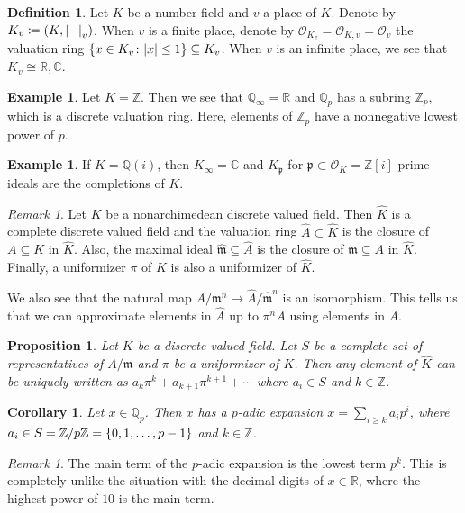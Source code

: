 \documentclass[leqno, openany]{memoir}
\newtheorem{cor}[thm]{Corollary}
\newtheorem{prop}[thm]{Proposition}
\theoremstyle{definition}
\newtheorem{defn}[thm]{Definition}
\newtheorem{exm}[thm]{Example}
\theoremstyle{remark}
\newtheorem{rmk}[thm]{Remark}
\theoremstyle{plain}
\theoremstyle{definition}
\theoremstyle{remark}
\newcommand{\R}{\mathbb{R}}
\newcommand{\C}{\mathbb{C}}
\newcommand{\Z}{\mathbb{Z}}
\newcommand{\Q}{\mathbb{Q}}
\newcommand{\mc}[1]{\mathcal{#1}}
\newcommand{\mf}[1]{\mathfrak{#1}}
\newcommand{\wh}[1]{\widehat{#1}}
\begin{document}
\begin{defn} Let $K$ be a number field and $v$ a place of $K$. Denote by $K_v
    \coloneqq (K, \abs{-}_v)$. When $v$ is a finite place, denote by
    $\mc{O}_{K_v} = \mc{O}_{K,v} = \mc{O}_v$ the valuation ring $\qty{x \in K_v
    \colon \abs{x} \leq 1} \subseteq K_v$. When $v$ is an infinite place, we
    see that $K_v \cong \R, \C$.  \end{defn}

\begin{exm} Let $K = \Z$. Then we see that $\Q_{\infty} = \R$ and $\Q_p$ has a
subring $\Z_p$, which is a discrete valuation ring. Here, elements of $\Z_p$
have a nonnegative lowest power of $p$.  \end{exm}

\begin{exm} If $K = \Q(i)$, then $K_{\infty} = \C$ and $K_{\mf{p}}$ for $\mf{p}
\subset \mc{O}_K = \Z[i]$ prime ideals are the completions of $K$.  \end{exm}

\begin{rmk} Let $K$ be a nonarchimedean discrete valued field. Then $\wh{K}$ is
    a complete discrete valued field and the valuation ring $\wh{A} \subset
    \wh{K}$ is the closure of $A \subseteq K$ in $\wh{K}$. Also, the maximal
    ideal $\wh{\mf{m}} \subseteq \wh{A}$ is the closure of $\mf{m} \subseteq A$
    in $\wh{K}$. Finally, a uniformizer $\pi$ of $K$ is also a uniformizer of
    $\wh{K}$.

    We also see that the natural map $A / \mf{m}^n \to \wh{A} / \wh{\mf{m}}^n$
is an isomorphism. This tells us that we can approximate elements in $\wh{A}$
up to $\pi^n A$ using elements in $A$.  \end{rmk}

\begin{prop} Let $K$ be a discrete valued field. Let $S$ be a complete set of
    representatives of $A/\mf{m}$ and $\pi$ be a uniformizer of $K$. Then any
    element of $\wh{K}$ can be uniquely written as $a_k \pi^k + a_{k+1}
    \pi^{k+1} + \cdots$ where $a_i \in S$ and $k \in \Z$.  \end{prop}

\begin{cor} Let $x \in \Q_p$. Then $x$ has a \textit{$p$-adic expansion} $x =
\sum_{i \geq k} a_i p^i$, where $a_i \in S = \Z/p\Z = \qty{0, 1, \ldots, p-1}$
and $k \in \Z$.  \end{cor}

\begin{rmk} The main term of the $p$-adic expansion is the lowest term $p^k$.
This is completely unlike the situation with the decimal digits of $x \in \R$,
where the highest power of $10$ is the main term.  \end{rmk}
\end{document}
